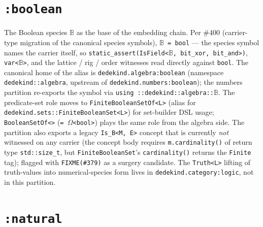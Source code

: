\documentclass[11pt, a4paper]{report}
\begin{document}
\section{\texttt{:boolean}}
\label{sec:numbers-boolean}

The Boolean species $\mathbb{B}$ as the base of the embedding chain. Per \#400 (carrier-type migration of the canonical species symbols), \texttt{$\mathbb{B}$ = bool} --- the species symbol names the carrier itself, so \texttt{static\_assert(IsField<$\mathbb{B}$, bit\_xor, bit\_and>)}, \texttt{var<$\mathbb{B}$>}, and the lattice / rig / order witnesses read directly against \texttt{bool}. The canonical home of the alias is \texttt{dedekind.algebra:boolean} (namespace \texttt{dedekind::algebra}, upstream of \texttt{dedekind.numbers:boolean}); the numbers partition re-exports the symbol via \texttt{using ::dedekind::algebra::$\mathbb{B}$}. The predicate-set role moves to \texttt{FiniteBooleanSetOf<L>} (alias for \texttt{dedekind.sets::FiniteBooleanSet<L>}) for set-builder DSL usage; \texttt{BooleanSetOf<>} (\texttt{= $\Omega$<bool>}) plays the same role from the algebra side. The partition also exports a legacy \texttt{Is\_B<M, E>} concept that is currently \emph{not} witnessed on any carrier (the concept body requires \texttt{m.cardinality()} of return type \texttt{std::size\_t}, but \texttt{FiniteBooleanSet}'s \texttt{cardinality()} returns the \texttt{Finite} tag); flagged with \texttt{FIXME(\#379)} as a surgery candidate. The \texttt{Truth<L>} lifting of truth-values into numerical-species form lives in \texttt{dedekind.category:logic}, not in this partition.

\section{\texttt{:natural}}
\label{sec:numbers-natural}
\end{document}
